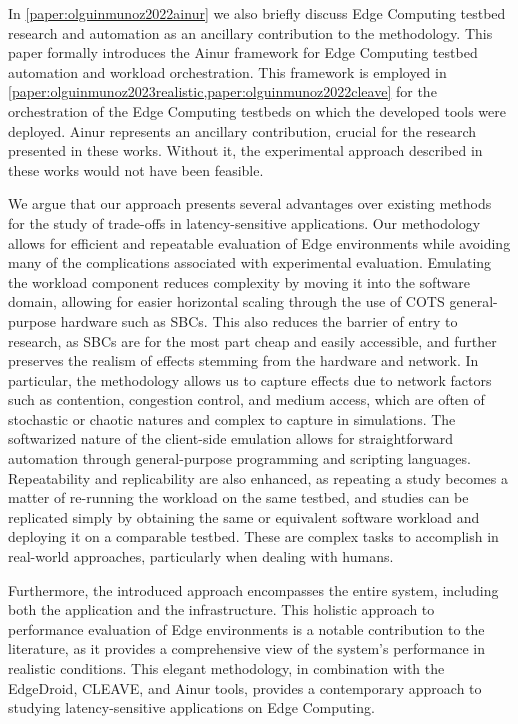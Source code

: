 In \cref{paper:olguinmunoz2022ainur} we also briefly discuss Edge Computing testbed research and automation as an ancillary contribution to the methodology.
This paper formally introduces the Ainur framework for Edge Computing testbed automation and workload orchestration.
This framework is employed in \cref{paper:olguinmunoz2023realistic,paper:olguinmunoz2022cleave} for the orchestration of the Edge Computing testbeds on which the developed tools were deployed.
Ainur represents an ancillary contribution, crucial for the research presented in these works.
Without it, the experimental approach described in these works would not have been feasible.

We argue that our approach presents several advantages over existing methods for the study of trade-offs in latency-sensitive applications.
Our methodology allows for efficient and repeatable evaluation of Edge environments while avoiding many of the complications associated with experimental evaluation.
Emulating the workload component reduces complexity by moving it into the software domain, allowing for easier horizontal scaling through the use of \gls{COTS} general-purpose hardware such as \glspl{SBC}.
This also reduces the barrier of entry to  research, as \glspl{SBC} are for the most part cheap and easily accessible, and further preserves the realism of effects stemming from the hardware and network.
In particular, the methodology allows us to capture effects due to network factors such as contention, congestion control, and medium access, which are often of stochastic or chaotic natures and complex to capture in simulations.
The softwarized nature of the client-side emulation allows for straightforward automation through general-purpose programming and scripting languages.
Repeatability and replicability are also enhanced, as repeating a study becomes a matter of re-running the workload on the same testbed, and studies can be replicated simply by obtaining the same or equivalent software workload and deploying it on a comparable testbed.
These are complex tasks to accomplish in real-world approaches, particularly when dealing with humans.

Furthermore, the introduced approach encompasses the entire system, including both the application and the infrastructure. 
This holistic approach to performance evaluation of Edge environments is a notable contribution to the literature, as it provides a comprehensive view of the system's performance in realistic conditions.
This elegant methodology, in combination with the EdgeDroid, \gls{CLEAVE}, and Ainur tools, provides a contemporary approach to studying latency-sensitive applications on Edge Computing.

